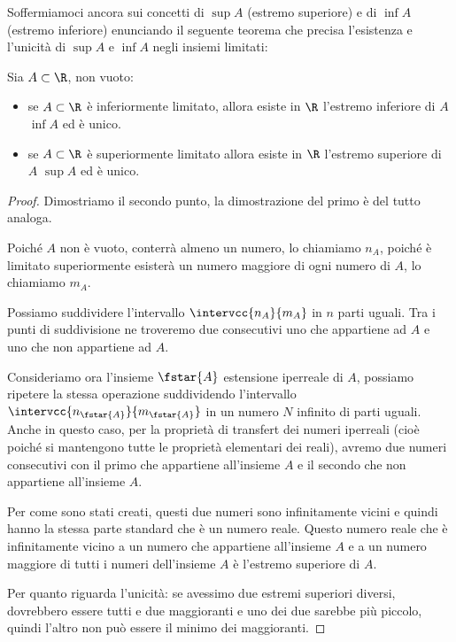 Soffermiamoci ancora sui concetti di \(\sup{A}\) (estremo superiore) e 
di \(\inf{A}\) (estremo inferiore) enunciando il seguente teorema che 
precisa l'esistenza e l'unicità di \(\sup{A}\) e \(\inf{A}\) negli insiemi 
limitati:
\begin{newtheo}
Sia \(A\subset\R\), non vuoto:
\begin{itemize} [nosep]
\item se \(A \subset \R\) è inferiormente limitato, allora esiste in \(\R\) 
l'estremo inferiore di \(A\) \(\inf{A}\) ed è unico.
\item se \(A \subset \R\) è superiormente limitato allora esiste in \(\R\) 
l'estremo superiore di \(A\) \(\sup{A}\) ed è unico.
\end{itemize}
\end{newtheo}
\begin{proof}
Dimostriamo il secondo punto, la dimostrazione del primo è del tutto 
analoga.

Poiché \(A\) non è vuoto, conterrà almeno un numero, lo chiamiamo \(n_A\), 
poiché è limitato superiormente esisterà un numero maggiore di ogni numero 
di \(A\), lo chiamiamo \(m_A\).

Possiamo suddividere l'intervallo \(\intervcc{n_A}{m_A}\) in \(n\) parti 
uguali.
Tra i punti di suddivisione ne troveremo due consecutivi uno che appartiene 
ad \(A\) e uno che non appartiene ad \(A\).

Consideriamo ora l'insieme \(\fstar{A}\) estensione iperreale di \(A\), 
possiamo ripetere la stessa operazione suddividendo l'intervallo 
\(\intervcc{n_{\fstar{A}}}{m_{\fstar{A}}}\) in un numero \(N\) infinito di 
parti uguali.
Anche in questo caso, per la proprietà di transfert dei numeri iperreali 
(cioè poiché si mantengono tutte le proprietà elementari dei reali), avremo 
due numeri consecutivi con il primo che appartiene all'insieme \(A\) e il 
secondo che non appartiene all'insieme \(A\).

Per come sono stati creati, questi due numeri sono infinitamente vicini e 
quindi hanno la stessa parte standard che è un numero reale.
Questo numero reale che è infinitamente vicino a un numero che appartiene 
all'insieme \(A\) e a un numero maggiore di tutti i numeri dell'insieme 
\(A\) è l'estremo superiore di \(A\).

Per quanto riguarda l'unicità: se avessimo due estremi superiori diversi, 
dovrebbero essere tutti e due maggioranti e uno dei due sarebbe più piccolo, 
quindi l'altro non può essere il minimo dei maggioranti.
\end{proof}

